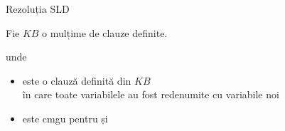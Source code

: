 \documentclass[xcolor=pdftex,romanian,colorlinks]{beamer}
\begin{document}
\begin{frame}{Rezoluția SLD}
 
\vspace{.2cm}
Fie $KB$ o mulțime de clauze definite.

\medskip
\begin{center}

\end{center}
\vspace{-.2cm}
unde 
\begin{itemize}
  \item {} este o clauză definită din $KB$\\
   în care toate variabilele au fost redenumite cu variabile noi

  \item \intens{ $\theta$} este cmgu pentru  și 

\end{itemize}
\end{frame}
\end{document}
